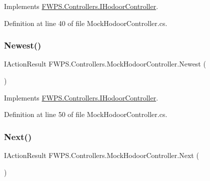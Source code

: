 Implements \mbox{\hyperlink{interface_f_w_p_s_1_1_controllers_1_1_i_hodoor_controller_a7676bf587ad504f1e5e7c1802f964489}{F\+W\+P\+S.\+Controllers.\+I\+Hodoor\+Controller}}.



Definition at line 40 of file Mock\+Hodoor\+Controller.\+cs.

\mbox{\label{class_f_w_p_s_1_1_controllers_1_1_mock_hodoor_controller_ae87240e17b820c203ca8563ca46a598f}} 
\subsubsection{\texorpdfstring{Newest()}{Newest()}}
{\footnotesize\ttfamily I\+Action\+Result F\+W\+P\+S.\+Controllers.\+Mock\+Hodoor\+Controller.\+Newest (\begin{DoxyParamCaption}{ }\end{DoxyParamCaption})}



Implements \mbox{\hyperlink{interface_f_w_p_s_1_1_controllers_1_1_i_hodoor_controller_a39f296accada798a0f161ba8e0ad8777}{F\+W\+P\+S.\+Controllers.\+I\+Hodoor\+Controller}}.



Definition at line 50 of file Mock\+Hodoor\+Controller.\+cs.

\mbox{\label{class_f_w_p_s_1_1_controllers_1_1_mock_hodoor_controller_a58c25ec4850b5c078ba684d3c5c18341}} 
\subsubsection{\texorpdfstring{Next()}{Next()}}
{\footnotesize\ttfamily I\+Action\+Result F\+W\+P\+S.\+Controllers.\+Mock\+Hodoor\+Controller.\+Next (\begin{DoxyParamCaption}{ }\end{DoxyParamCaption})}



